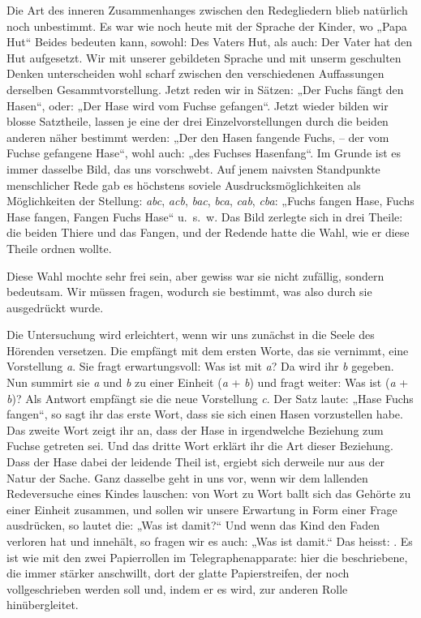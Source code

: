 Die Art des inneren Zusammenhanges zwischen den Redegliedern blieb natürlich noch unbestimmt. Es war wie noch heute mit der Sprache der Kinder, wo „Papa Hut“ Beides bedeuten kann, sowohl: Des Vaters Hut, als auch: Der Vater hat den Hut aufgesetzt. Wir mit unserer gebildeten Sprache und mit unserm geschulten Denken unterscheiden wohl scharf zwischen den verschiedenen Auffassungen derselben Gesammtvorstellung. Jetzt reden wir in Sätzen: „Der Fuchs fängt den Hasen“, oder: „Der Hase wird vom Fuchse gefangen“. Jetzt wieder bilden wir blosse Satztheile, lassen je eine der drei Einzelvorstellungen durch die beiden anderen näher bestimmt werden: „Der den Hasen fangende Fuchs, – der vom Fuchse gefangene Hase“, wohl auch: „des Fuchses Hasenfang“. Im Grunde ist es immer dasselbe Bild, das uns vorschwebt. Auf jenem naivsten Standpunkte menschlicher Rede gab es höchstens soviele Ausdrucksmöglichkeiten als Möglichkeiten der Stellung: \textit{abc}, \textit{acb}, \textit{bac}, \textit{bca}, \textit{cab}, \textit{cba}: „Fuchs fangen Hase, Fuchs Hase fangen, Fangen Fuchs Hase“ u.~s.~w. Das Bild zerlegte sich in drei Theile: die beiden Thiere und das Fangen, und der Redende hatte die Wahl, wie er diese Theile ordnen wollte.

\label{sp.369}

Diese Wahl mochte sehr frei sein, aber gewiss war sie nicht zufällig, sondern bedeutsam. Wir müssen fragen, wodurch sie bestimmt, was also durch sie ausgedrückt wurde.

Die Untersuchung wird erleichtert, wenn wir uns zunächst in die Seele des Hörenden versetzen. Die empfängt mit dem ersten Worte, das sie vernimmt, eine Vorstellung \textit{a}. Sie fragt erwartungsvoll: Was ist \label{fp.353} mit \textit{a}? Da wird ihr \textit{b} gegeben. Nun summirt sie \textit{a} und \textit{b} zu einer Einheit (\textit{a} + \textit{b}) und fragt weiter: Was ist (\textit{a} + \textit{b})? Als Antwort empfängt sie die neue Vorstellung \textit{c}. Der Satz laute: „Hase Fuchs fangen“, so sagt ihr das erste Wort, dass sie sich einen Hasen vorzustellen habe. Das zweite Wort zeigt ihr an, dass der Hase in irgendwelche Beziehung zum Fuchse getreten sei. Und das dritte Wort erklärt ihr die Art dieser Beziehung. Dass der Hase dabei der leidende Theil ist, ergiebt sich derweile nur aus der Natur der Sache. Ganz dasselbe geht in uns vor, wenn wir dem lallenden Redeversuche eines Kindes lauschen: von Wort zu Wort ballt sich das Gehörte zu einer Einheit zusammen, und sollen wir unsere Erwartung in Form einer Frage ausdrücken, so lautet die: „Was ist damit?“ Und wenn das Kind den Faden verloren hat und innehält, so fragen wir es auch: „Was ist damit.“ Das heisst: . Es ist wie mit den zwei Papierrollen im Telegraphenapparate: hier die beschriebene, die immer stärker anschwillt, dort der glatte Papierstreifen, der noch vollgeschrieben werden soll und, indem er es wird, zur anderen Rolle hinübergleitet.

